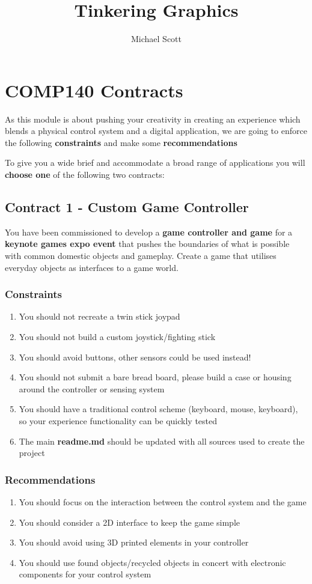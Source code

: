 \documentclass{../../fal_assignment}
\title{Tinkering Graphics}
\author{Michael Scott}
\begin{document}
\section*{COMP140 Contracts}

As this module is about pushing your creativity in creating an experience which blends a physical control system and a digital application, we are going to enforce the following \textbf{constraints} and make some \textbf{recommendations}

To give you a wide brief and accommodate a broad range of applications you will \textbf{choose one} of the following two contracts:

\subsection*{Contract 1 - Custom Game Controller}

You have been commissioned to develop a \textbf{game controller and game} for a \textbf{keynote games expo event} that pushes the boundaries of what is possible with common domestic objects and gameplay. Create a game that utilises everyday objects as interfaces to a game world.
	\subsubsection*{Constraints}
	\begin{enumerate}
		\item You should not recreate a twin stick joypad
		\item You should not build a custom joystick/fighting stick
		\item You should avoid buttons, other sensors could be used instead!
		\item You should not submit a bare bread board, please build a case or housing around the controller or sensing system
		\item You should have a traditional control scheme (keyboard, mouse, keyboard), so your experience functionality can be quickly tested 
		\item The main \textbf{readme.md} should be updated with all sources used to create the project
	\end{enumerate}
	
	\subsubsection*{Recommendations}
	\begin{enumerate}
		\item You should focus on the interaction between the control system and the game
		\item You should consider a 2D interface to keep the game simple
		\item You should avoid using 3D printed elements in your controller
		\item You should use found objects/recycled objects in concert with electronic components for your control system
	\end{enumerate}
	
\end{document}
